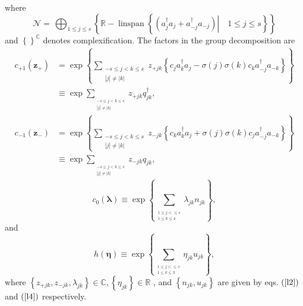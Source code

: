 \documentclass[12pt,aps,amsfonts,amssymb,tightenlines]{revtex4}%
\begin{document}
where
\begin{equation}
\mathcal{N=\,}%
{\textstyle\bigoplus_{1\leq j\leq s}}
\left\{  \mathbb{R-}\operatorname{linspan}\left\{  \left.  \left(
a_{j}^{\dagger}a_{j}+a_{-j}^{\dagger}a_{-j}\right)  \right\vert \quad1\leq
j\leq s\right\}  \right\}
\end{equation}
and $\left\{  {}\right\}  ^{\mathbb{C}}$ denotes complexification. The factors
in the group decomposition are%
\begin{align}
c_{+1}\left(  \mathbf{z}_{+}\right)   &  =\exp\left\{  \sum
\limits_{\substack{-s\leq j<k\leq s\\\left\vert j\right\vert \neq\left\vert
k\right\vert }}z_{+jk}\left\{  c_{j}a_{k}^{\dagger}a_{j}-\sigma\left(
j\right)  \sigma\left(  k\right)  c_{k}a_{-j}^{\dagger}a_{-k}\right\}
\right\} \nonumber\\
&  \equiv\exp\sum\limits_{_{\substack{-s\leq j<k\leq s\\\left\vert
j\right\vert \neq\left\vert k\right\vert }}}z_{+jk}q_{jk}^{\dagger},
\label{co1}%
\end{align}%
\begin{align}
c_{-1}\left(  \mathbf{z}_{-}\right)   &  =\exp\left\{  \sum
\limits_{\substack{-s\leq j<k\leq s\\\left\vert j\right\vert \neq\left\vert
k\right\vert }}z_{-jk}\left\{  c_{k}a_{k}^{\dagger}a_{j}+\sigma\left(
j\right)  \sigma\left(  k\right)  c_{j}a_{-j}^{\dagger}a_{-k}\right\}
\right\} \nonumber\\
&  \equiv\exp\sum\limits_{_{\substack{-s\leq j<k\leq s\\\left\vert
j\right\vert \neq\left\vert k\right\vert }}}z_{-jk}q_{jk}, \label{co2}%
\end{align}%
\begin{equation}
c_{0}\left(  \mathbf{\lambda}\right)  \equiv\exp\left\{  \sum
\limits_{_{\substack{1\leq j<\leq s\\1\leq k\leq4}}}\lambda_{jk}%
n_{jk}\right\}  , \label{co3}%
\end{equation}
and
\begin{equation}
h\left(  \mathbf{\eta}\right)  \equiv\exp\left\{  \sum
\limits_{_{\substack{1\leq j<\leq s\\1\leq k\leq3}}}\eta_{jk}u_{jk}\right\}  ,
\label{co4}%
\end{equation}
where $\left\{  z_{+jk},z_{-jk},\lambda_{jk}\right\}  \in\mathbb{C},\left\{
\eta_{jk}\right\}  \in\mathbb{R}$ , and $\left\{  n_{jk},u_{jk}\right\}  $ are
given by eqs. $\left(  \ref{l2}\right)  $ and $\left(  \ref{l4}\right)  $ respectively.
\end{document}
